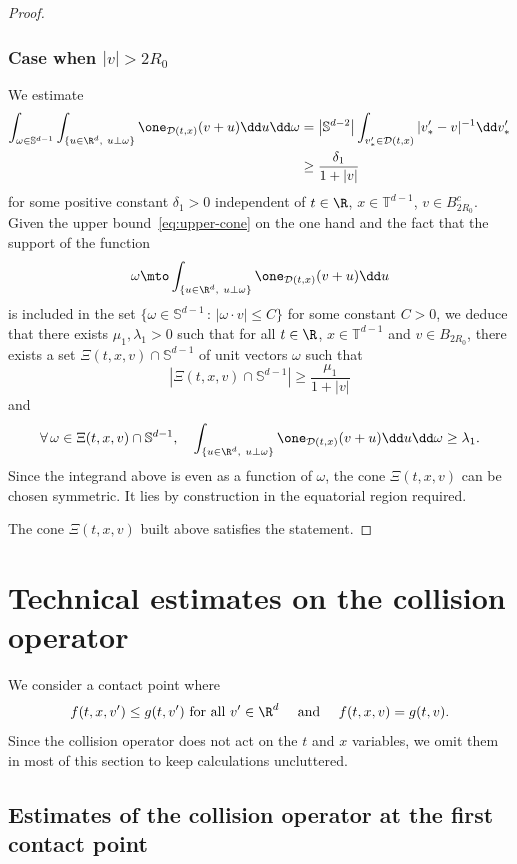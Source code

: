 \begin{proof}
\subsubsection*{Case when $|v| > 2 R_0$}
We estimate
\begin{align*}
\int_{\omega \in \mathbb{S}^{d-1}} \int_{\{ u \in \R^{d}, \ u \bot
\omega \}} \one_{\mathcal{D}(t,x)}(v+u) \dd u \dd \omega
&=\left| \mathbb{S}^{d-2} \right| \int_{v'_* \in \mathcal{D}(t,x)}
|v'_*-v|^{-1} \dd v'_*\\
& \ge \frac{\delta_1}{1+|v|}
\end{align*}
for some positive constant $\delta_1 >0$ independent of $t \in \R$,
$x \in \mathbb{T}^{d-1}$, $v \in B_{2R_0}^c$. Given the upper
bound~\eqref{eq:upper-cone} on the one hand and the fact that the
support of the function
\[
\omega \mto \int_{\{ u \in \R^{d}, \ u \bot \omega \}}
\one_{\mathcal{D}(t,x)}(v+u) \dd u
\]
is included in the set $\{ \omega \in \mathbb{S}^{d-1} \, : \,
|\omega \cdot v| \le C\}$ for some constant $C>0$, we deduce that
there exists $\mu_1,\lambda_1>0$ such that for all $t \in \R$,
$x \in \mathbb{T}^{d-1}$ and $v \in B_{2R_0}$, there exists a set
$\Xi(t,x,v) \cap \mathbb{S}^{d-1}$ of unit vectors $\omega$ such
that
\[
\left| \Xi(t,x,v) \cap \mathbb{S}^{d-1} \right| \ge \frac{\mu_1}{1+|v|}
\]
and
\[
\forall \, \omega \in \Xi(t,x,v) \cap \mathbb{S}^{d-1}, \quad
\int_{\{ u \in \R^{d}, \ u \bot \omega \}}
\one_{\mathcal{D}(t,x)}(v+u) \dd u \dd \omega \ge \lambda_1.
\]
Since the integrand above is even as a function of $\omega$, the
cone $\Xi(t,x,v)$ can be chosen symmetric. It lies by construction
in the equatorial region required.

The cone $\Xi(t,x,v)$ built above satisfies the statement.
\end{proof}

\section{Technical estimates on the collision operator}
\label{s:estimates}

We consider a contact point where
\begin{equation}\label{eq:contact}
f (t,x,v') \le g (t,v') \text{ for all } v' \in \R^d \quad \text{ and } \quad f(t,x,v) = g(t,v).
\end{equation}
Since the collision operator does not act on the $t$ and $x$
variables, we omit them in most of this section to keep calculations
uncluttered.

\subsection{Estimates of the collision operator at the first contact point}

